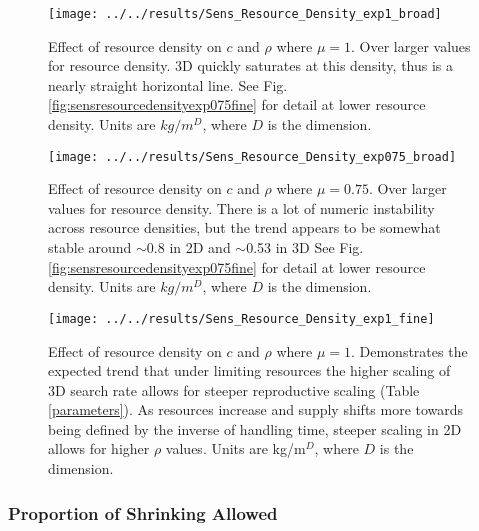 \begin{figure}[H]
	\centering
	\texttt{[image: ../../results/Sens\_Resource\_Density\_exp1\_broad]}
	\caption{Effect of resource density on $c$ and $\rho$ where $\mu = 1$.  Over larger values for resource density.  3D quickly saturates at this density, thus is a nearly straight horizontal line.  See Fig. \ref{fig:sensresourcedensityexp075fine} for detail at lower resource density.  Units are $kg/m^D$, where $D$ is the dimension.}
	\label{fig:sensresourcedensityexp1broad}
\end{figure}
\begin{figure}[h]
	\centering
	\texttt{[image: ../../results/Sens\_Resource\_Density\_exp075\_broad]}
	\caption{Effect of resource density on $c$ and $\rho$ where $\mu = 0.75$.  Over larger values for resource density.  There is a lot of numeric instability across resource densities, but the trend appears to be somewhat stable around $\sim$0.8 in 2D and $\sim$0.53 in 3D See Fig. \ref{fig:sensresourcedensityexp075fine} for detail at lower resource density.  Units are $kg/m^D$, where $D$ is the dimension.}
	\label{fig:sensresourcedensityexp075broad}
\end{figure}
	\begin{figure}[h!]
	\centering
	\texttt{[image: ../../results/Sens\_Resource\_Density\_exp1\_fine]}
	\caption{Effect of resource density on $c$ and $\rho$ where $\mu = 1$.  Demonstrates the expected trend that under limiting resources the higher scaling of 3D search rate  allows for steeper reproductive scaling (Table \ref{parameters}).  As resources increase and supply shifts more towards being defined by the inverse of handling time, steeper scaling in 2D allows for higher $\rho$ values.  Units are kg/m$^D$, where $D$ is the dimension.}
	\label{fig:sensresourcedensityexp1fine}
\end{figure}





\subsubsection{Proportion of Shrinking Allowed}

